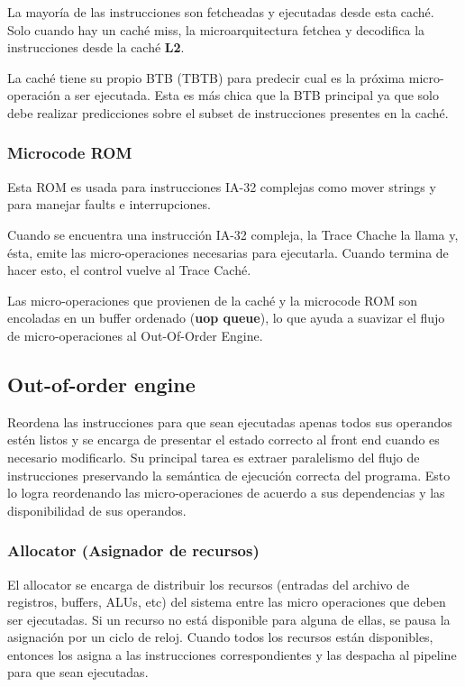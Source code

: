 La mayoría de las instrucciones son fetcheadas y ejecutadas desde esta caché. Solo cuando hay un caché miss, la microarquitectura fetchea y decodifica la instrucciones desde la caché \textbf{L2}.

La caché tiene su propio BTB (TBTB) para predecir cual es la próxima micro-operación a ser ejecutada. Esta es más chica que la BTB principal ya que solo debe realizar predicciones sobre el subset de instrucciones presentes en la caché.

\subsubsection*{Microcode ROM}
Esta ROM es usada para instrucciones IA-32 complejas como mover strings y para manejar faults e interrupciones.

Cuando se encuentra una instrucción IA-32 compleja, la Trace Chache la llama y, ésta, emite las micro-operaciones necesarias para ejecutarla. Cuando termina de hacer esto, el control vuelve al Trace Caché.

Las micro-operaciones que provienen de la caché y la microcode ROM son encoladas en un buffer ordenado (\textbf{uop queue}), lo que ayuda a suavizar el flujo de micro-operaciones al Out-Of-Order Engine.

\subsection{Out-of-order engine}
Reordena las instrucciones para que sean ejecutadas apenas todos sus operandos estén listos y se encarga de presentar el estado correcto al front end cuando es necesario modificarlo. Su principal tarea es extraer paralelismo del flujo de instrucciones preservando la semántica de ejecución correcta del programa. Esto lo logra reordenando las micro-operaciones de acuerdo a sus dependencias y las disponibilidad de sus operandos.


\subsubsection*{Allocator (Asignador de recursos)}
El allocator se encarga de distribuir los recursos (entradas del archivo de registros, buffers, ALUs, etc) del sistema entre las micro operaciones que deben ser ejecutadas. Si un recurso no está disponible para alguna de ellas, se pausa la asignación por un ciclo de reloj. Cuando todos los recursos están disponibles, entonces los asigna a las instrucciones correspondientes y las despacha al pipeline para que sean ejecutadas.


